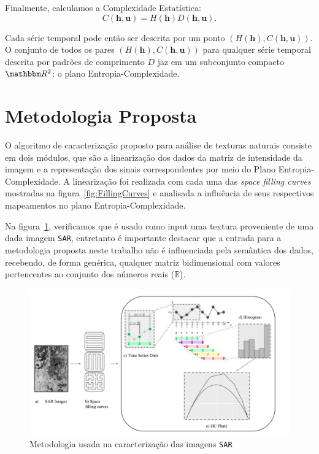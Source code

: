 \documentclass[remotesensing,article,submit,moreauthors,pdftex,10pt,a4paper]{Definitions/mdpi}
\begin{document}
	Finalmente, calculamos a Complexidade Estatística:
	\begin{equation}
	C(\bm h, \bm u) = H(\bm h) D(\bm h, \bm u).
	\end{equation}
	
	Cada série temporal pode então ser descrita por um ponto $(H(\bm h), C(\bm h, \bm u))$.
	O conjunto de todos os pares $(H(\bm h), C(\bm h, \bm u))$ para qualquer série temporal descrita por padrões de comprimento $D$ jaz em um subconjunto compacto $\mathbbm R^2$: o plano Entropia-Complexidade.
	
	\section{Metodologia Proposta}\label{Metodologia}
	
	O algoritmo de caracterização proposto para análise de texturas naturais consiste em dois módulos, que são a linearização dos dados da matriz de intensidade da imagem e a representação dos sinais correspondentes por meio do Plano Entropia-Complexidade. A linearização foi realizada com cada uma das \textit{space filling curves} mostradas na figura~\ref{fig:FillingCurves} e analisada a influência de seus respectivos mapeamentos no plano Entropia-Complexidade.
	
	Na figura~\ref{fig:MethodologySAR}, verificamos que é usado como input uma textura proveniente de uma dada imagem \texttt{SAR}, entretanto é importante destacar que a entrada para a metodologia proposta neste trabalho não é influenciada pela semântica dos dados, recebendo, de forma genérica, qualquer matriz bidimensional com valores pertencentes ao conjunto dos números reais ($\mathbb{R}$).
	
	\begin{figure}[!h]
		\centering
		\includegraphics[scale = 0.5]{Figures/MethodologySAR.pdf}    
		\caption{Metodologia usada na caracterização das imagens \texttt{SAR}}
		\label{fig:MethodologySAR}
	\end{figure}
	
\end{document}
